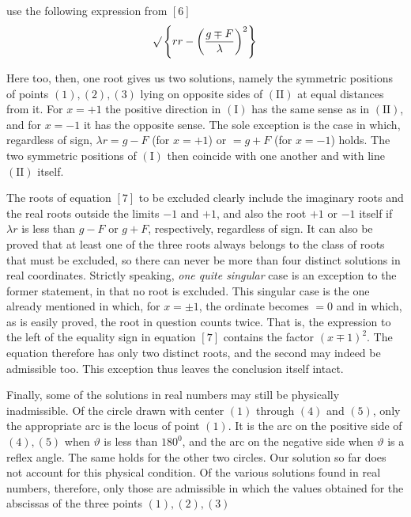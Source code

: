 %
use the following expression from \([6]\)
\[\mathord{{}^{}\!\surd}\left\{rr-\left(\frac{g\mp F}{\lambda}\right)^2\right\}\]
\par
Here too, then, one root gives us two solutions, namely the symmetric positions of points \((1),(2),(3)\) lying on opposite sides of \(\mathrm{(II)}\) at equal distances from it. For \(x=+1\) the positive direction in \(\mathrm{(I)}\) has the same sense as in \(\mathrm{(II)}\), and for \(x=-1\) it has the opposite sense. The sole exception is the case in which, regardless of sign, \(\lambda r=g-F\) (for \(x=+1\)) or \(=g+F\) (for \(x=-1\)) holds. The two symmetric positions of \(\mathrm{(I)}\) then coincide with one another and with line \(\mathrm{(II)}\) itself.

The roots of equation \([7]\) to be excluded clearly include the imaginary roots and the real roots outside the limits \(-1\) and \(+1\), and also the root \(+1\) or \(-1\) itself if \(\lambda r\) is less than \(g-F\) or \(g+F\), respectively, regardless of sign. It can also be proved that at least one of the three roots always belongs to the class of roots that must be excluded, so there can never be more than four distinct solutions in real coordinates. Strictly speaking, \textit{one quite singular} case is an exception to the former statement, in that no root is excluded. This singular case is the one already mentioned in which, for \(x=\pm1\), the ordinate becomes \(=0\) and in which, as is easily proved, the root in question counts twice. That is, the expression to the left of the equality sign in equation \([7]\) contains the factor \((x\mp1)^2\). The equation therefore has only two distinct roots, and the second may indeed be admissible too. This exception thus leaves the conclusion itself intact.

Finally, some of the solutions in real numbers may still be physically inadmissible. Of the circle drawn with center \((1)\) through \((4)\) and \((5)\), only the appropriate arc is the locus of point \((1)\). It is the arc on the positive side of \((4),(5)\) when \(\vartheta\) is less than \(180^0\), and the arc on the negative side when \(\vartheta\) is a reflex angle. The same holds for the other two circles. Our solution so far does not account for this physical condition. Of the various solutions found in real numbers, therefore, only those are admissible in which the values obtained for the abscissas of the three points \((1),(2),(3)\)
